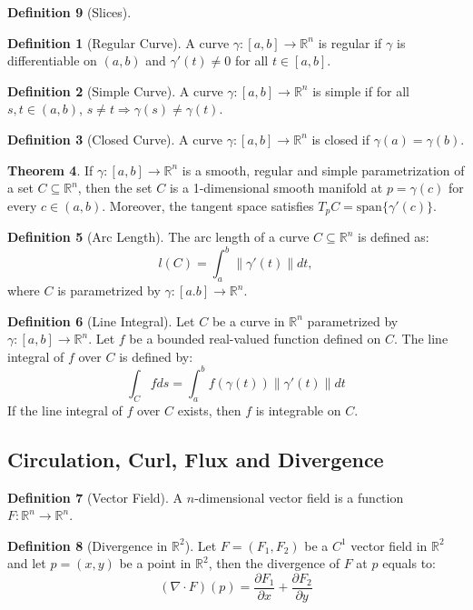 \documentclass[12pt]{article}
\theoremstyle{definition}
\newtheorem{definition}{Definition}[subsection]
\newtheorem{theorem}[definition]{Theorem}
\theoremstyle{remark}
\begin{document}
\begin{definition}[Slices]
\begin{definition}[Regular Curve]
A curve $\gamma:[a,b]\to\mathbb{R}^n$ is regular if $\gamma$ is differentiable on $(a,b)$ and $\gamma'(t)\neq 0$ for all $t\in[a,b]$.
\end{definition}

\begin{definition}[Simple Curve]
A curve $\gamma:[a,b]\to\mathbb{R}^n$ is simple if for all $s,t\in (a,b)$, $s\ne t\Rightarrow \gamma(s)\ne\gamma(t)$.
\end{definition}

\begin{definition}[Closed Curve]
A curve $\gamma:[a,b]\to\mathbb{R}^n$ is closed if $\gamma(a)=\gamma(b)$.
\end{definition}

\begin{theorem}
If $\gamma:[a,b]\to\mathbb{R}^n$ is a smooth, regular and simple parametrization of a set $C\subseteq\mathbb{R}^n$, then the set $C$ is a 1-dimensional smooth manifold at $p=\gamma(c)$ for every $c\in(a,b)$. Moreover, the tangent space satisfies $T_pC=\text{span}\{\gamma'(c)\}$.
\end{theorem}

\begin{definition}[Arc Length]
The arc length of a curve $C\subseteq\mathbb{R}^n$ is defined as:
\[
l(C)=\int_a^b\|\gamma'(t)\|dt,
\]
where $C$ is parametrized by $\gamma:[a.b]\to\mathbb{R}^n$.
\end{definition}

\begin{definition}[Line Integral]
Let $C$ be a curve in $\mathbb{R}^n$ parametrized by $\gamma:[a,b]\to\mathbb{R}^n$. Let $f$ be a bounded real-valued function defined on $C$. The line integral of $f$ over $C$ is defined by:
\[
\int_Cfds=\int_a^bf(\gamma(t))\|\gamma'(t)\|dt
\]
If the line integral of $f$ over $C$ exists, then $f$ is integrable on $C$.
\end{definition}

\subsection{Circulation, Curl, Flux and Divergence}
\begin{definition}[Vector Field]
A $n$-dimensional vector field is a function $F:\mathbb{R}^n\to\mathbb{R}^n$.
\end{definition}

\begin{definition}[Divergence in $\mathbb{R}^2$]
Let $F=(F_1,F_2)$ be a $C^1$ vector field in $\mathbb{R}^2$ and let $p=(x,y)$ be a point in $\mathbb{R}^2$, then the divergence of $F$ at $p$ equals to:
\[
(\nabla\cdot F)(p)=\frac{\partial F_1}{\partial x}+\frac{\partial F_2}{\partial y}
\]
\end{definition}


\end{definition}
\end{document}
